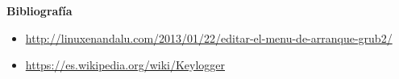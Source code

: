 \documentclass[11pt, a4paper]{report}
\begin{document}
\newpage

\textbf{Bibliografía} \\

\begin{itemize}

\item  \url{http://linuxenandalu.com/2013/01/22/editar-el-menu-de-arranque-grub2/}

\item \url{https://es.wikipedia.org/wiki/Keylogger}

\end{itemize}
\end{document}
